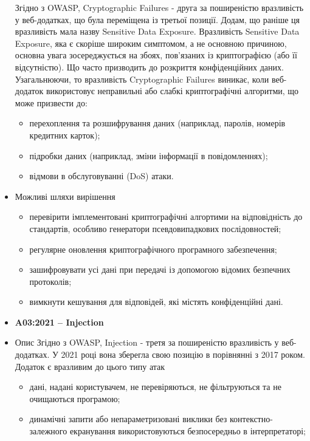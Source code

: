 \begin{itemize}
                Згідно з OWASP, Cryptographic Failures - друга за поширеністю вразливість у веб-додатках, що була переміщена із третьої позиції. Додам, що раніше ця вразливість мала назву  Sensitive Data Exposure. Вразливість Sensitive Data Exposure, яка є скоріше широким симптомом, а не основною причиною, основна увага зосереджується на збоях, пов’язаних із криптографією (або її відсутністю). Що часто призводить до розкриття конфіденційних даних. Узагальнюючи, то вразливість Cryptographic Failures виникає, коли веб-додаток використовує неправильні або слабкі криптографічні алгоритми, що може призвести до:
                \begin{itemize}
                    \item перехоплення та розшифрування даних (наприклад, паролів, номерів кредитних карток);
                    \item підробки даних (наприклад, зміни інформації в повідомленнях);
                    \item відмови в обслуговуванні (DoS) атаки.
                \end{itemize}
            \item Можливі шляхи вирішення
                \begin{itemize}
                    \item перевірити імплементовані криптографічні алгортими на відповідність до стандартів, особливо генератори псевдовипадкових послідовностей;
                    \item регулярне оновлення криптографічного програмного забезпечення;
                    \item зашифровувати усі дані при передачі із допомогою відомих безпечних протоколів;
                    \item вимкнути кешування для відповідей, які містять конфіденційні дані.
                \end{itemize}
    \item \textbf{A03:2021 – Injection}
            \item Опис
                Згідно з OWASP, Injection - третя за поширеністю вразливість у веб-додатках. У 2021 році вона зберегла свою позицію в порівнянні з 2017 роком. Додаток є вразливим до цього типу атак
                \begin{itemize}
                    \item дані, надані користувачем, не перевіряються, не фільтруються та не очищаються програмою;
                    \item динамічні запити або непараметризовані виклики без контекстно-залежного екранування використовуються безпосередньо в інтерпретаторі;

\end{itemize}
\end{itemize}
